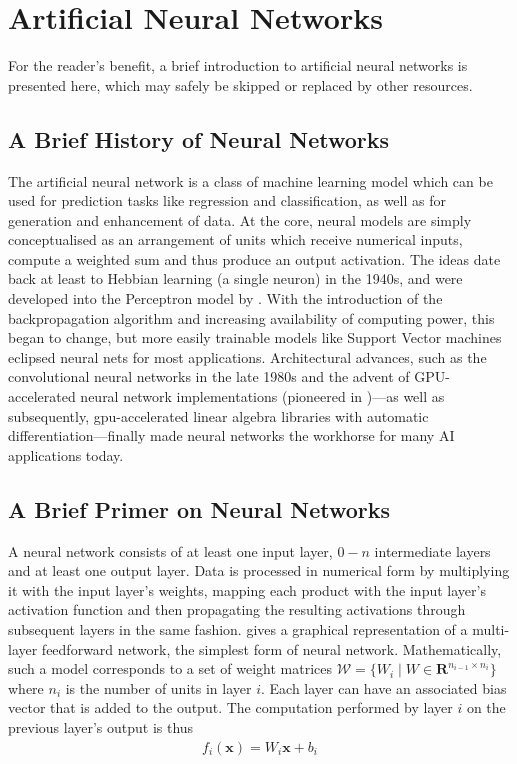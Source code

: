 \hypertarget{sec:anns}{%
\section{Artificial Neural Networks}\label{sec:anns}}

For the reader's benefit, a brief introduction to artificial neural networks is
presented here, which may safely be skipped or replaced by other resources.

\subsection*{A Brief History of Neural Networks}%

The artificial neural network is a class of machine learning model which can be
used for prediction tasks like regression and classification, as well as for
generation and enhancement of data.  At
the core, neural models are simply conceptualised as an arrangement of units
which receive numerical inputs, compute a weighted sum and thus produce an output
activation. The ideas date back at least to Hebbian learning (a single neuron)
in the 1940s, and were developed into the Perceptron model by
\citet{Rosenblatt58theperceptron}. With the introduction of the backpropagation
algorithm \citep{werbos1975beyond} and increasing availability of computing
power, this began to change, but more easily trainable models like Support
Vector machines eclipsed neural nets for most applications.  Architectural
advances, such as the convolutional neural networks in the late 1980s
\citep{LeCun:1989:BAH:1351079.1351090} and the advent of GPU-accelerated neural
network implementations (pioneered in \cite{Ciresan11flexible})---as well as
subsequently, gpu-accelerated linear algebra libraries with automatic
differentiation---finally made neural networks the workhorse for many AI
applications today.

\subsection*{A Brief Primer on Neural Networks}%

A neural network consists of at least one input layer, \(0-n\)
intermediate layers and at least one output layer. Data is processed in
numerical form by multiplying it with the input layer's weights, mapping
each product with the input layer's activation function and then
propagating the resulting activations through subsequent layers in the
same fashion.  gives a graphical representation of a
multi-layer feedforward network, the simplest form of neural network.
Mathematically, such a model corresponds to a set of weight matrices
$\mathcal{W} = \{W_i \mid W \in \mathbf{R}^{n_{i-1} \times n_i}\}$ where $n_i$
is the number of units in layer $i$. Each layer can have an associated bias
vector that is added to the output. The computation performed by layer $i$ on
the previous layer's output is
thus
\begin{align}
    f_i(\mathbf{x}) = W_i \mathbf{x} + b_i
\end{align}

